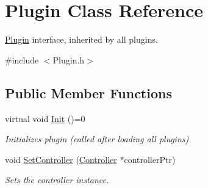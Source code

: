 \hypertarget{classPlugin}{\section{Plugin Class Reference}
\label{classPlugin}
}


\hyperlink{classPlugin}{Plugin} interface, inherited by all plugins.  




{\ttfamily \#include $<$Plugin.\-h$>$}

\subsection*{Public Member Functions}
\begin{DoxyCompactItemize}
\item 
\hypertarget{classPlugin_a1409a14522799cb9d1a41fabc40133e5}{virtual void \hyperlink{classPlugin_a1409a14522799cb9d1a41fabc40133e5}{Init} ()=0}\label{classPlugin_a1409a14522799cb9d1a41fabc40133e5}

\begin{DoxyCompactList}\small\item\em Initializes plugin (called after loading all plugins). \end{DoxyCompactList}\item 
void \hyperlink{classPlugin_a9de17bc24a2f84c533fc1fef9bff3c86}{Set\-Controller} (\hyperlink{structController}{Controller} $\ast$controller\-Ptr)
\begin{DoxyCompactList}\small\item\em Sets the controller instance. \end{DoxyCompactList}\end{DoxyCompactItemize}

